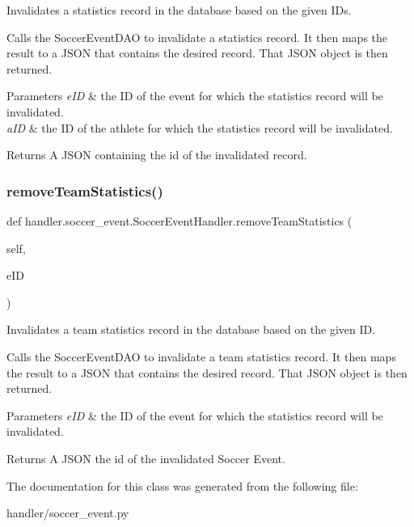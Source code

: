 Invalidates a statistics record in the database based on the given I\+Ds. 

Calls the Soccer\+Event\+D\+AO to invalidate a statistics record. It then maps the result to a J\+S\+ON that contains the desired record. That J\+S\+ON object is then returned.


\begin{DoxyParams}{Parameters}
{\em e\+ID} & the ID of the event for which the statistics record will be invalidated. \\
\hline
{\em a\+ID} & the ID of the athlete for which the statistics record will be invalidated.\\
\hline
\end{DoxyParams}
\begin{DoxyReturn}{Returns}
A J\+S\+ON containing the id of the invalidated record. 
\end{DoxyReturn}
\mbox{\label{classhandler_1_1soccer__event_1_1_soccer_event_handler_a435953be6920148b1f3eb47c6c656390}} 
\subsubsection{\texorpdfstring{remove\+Team\+Statistics()}{removeTeamStatistics()}}
{\footnotesize\ttfamily def handler.\+soccer\+\_\+event.\+Soccer\+Event\+Handler.\+remove\+Team\+Statistics (\begin{DoxyParamCaption}\item[{}]{self,  }\item[{}]{e\+ID }\end{DoxyParamCaption})}



Invalidates a team statistics record in the database based on the given ID. 

Calls the Soccer\+Event\+D\+AO to invalidate a team statistics record. It then maps the result to a J\+S\+ON that contains the desired record. That J\+S\+ON object is then returned.


\begin{DoxyParams}{Parameters}
{\em e\+ID} & the ID of the event for which the statistics record will be invalidated.\\
\hline
\end{DoxyParams}
\begin{DoxyReturn}{Returns}
A J\+S\+ON the id of the invalidated Soccer Event. 
\end{DoxyReturn}


The documentation for this class was generated from the following file\+:\begin{DoxyCompactItemize}
\item 
handler/soccer\+\_\+event.\+py\end{DoxyCompactItemize}

